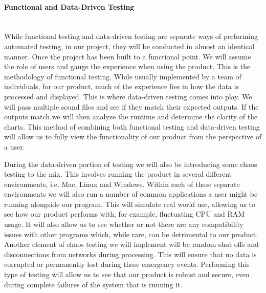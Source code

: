 \paragraph{Functional and Data-Driven Testing} \mbox{}\\[\paragraphheaderspace]
While functional testing and data-driven testing are separate ways of performing automated testing, in our project, they will be conducted in almost an identical manner. Once the project has been built to a functional point. We will assume the role of users and gauge the experience when using the product. This is the methodology of functional testing. While usually implemented by a team of individuals, for our product, much of the experience lies in how the data is processed and displayed. This is where data-driven testing comes into play. We will pass multiple sound files and see if they match their expected outputs. If the outputs match we will then analyze the runtime and determine the clarity of the charts. This method of combining both functional testing and data-driven testing will allow us to fully view the functionality of our product from the perspective of a user.\par
During the data-driven portion of testing we will also be introducing some chaos testing to the mix. This involves running the product in several different environments, i.e. Mac, Linux and Windows. Within each of these separate environments we will also run a number of common applications a user might be running alongside our program. This will simulate real world use, allowing us to see how our product performs with, for example, fluctuating CPU and RAM usage. It will also allow us to see whether or not there are any compatibility issues with other programs which, while rare, can be detrimental to our product. Another element of chaos testing we will implement will be random shut offs and disconnections from networks during processing. This will ensure that no data is corrupted or permanently lost during these emergency events. Performing this type of testing will allow us to see that our product is robust and secure, even during complete failures of the system that is running it.
